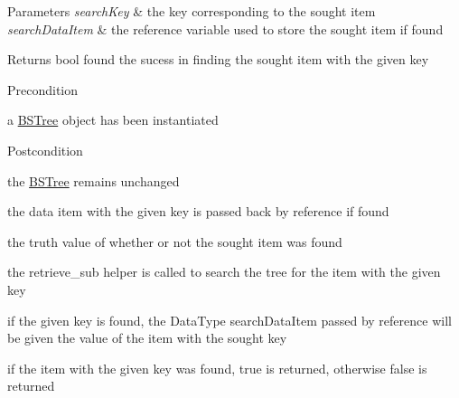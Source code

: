 \begin{DoxyParams}{\-Parameters}
{\em search\-Key} & the key corresponding to the sought item \\
\hline
{\em search\-Data\-Item} & the reference variable used to store the sought item if found\\
\hline
\end{DoxyParams}
\begin{DoxyReturn}{\-Returns}
bool found the sucess in finding the sought item with the given key
\end{DoxyReturn}
\begin{DoxyPrecond}{\-Precondition}

\begin{DoxyEnumerate}
\item a \hyperlink{class_b_s_tree}{\-B\-S\-Tree} object has been instantiated
\end{DoxyEnumerate}
\end{DoxyPrecond}
\begin{DoxyPostcond}{\-Postcondition}

\begin{DoxyEnumerate}
\item the \hyperlink{class_b_s_tree}{\-B\-S\-Tree} remains unchanged
\item the data item with the given key is passed back by reference if found
\item the truth value of whether or not the sought item was found
\end{DoxyEnumerate}
\end{DoxyPostcond}

\begin{DoxyEnumerate}
\item the retrieve\-\_\-sub helper is called to search the tree for the item with the given key
\item if the given key is found, the \-Data\-Type search\-Data\-Item passed by reference will be given the value of the item with the sought key
\item if the item with the given key was found, true is returned, otherwise false is returned
\end{DoxyEnumerate}


